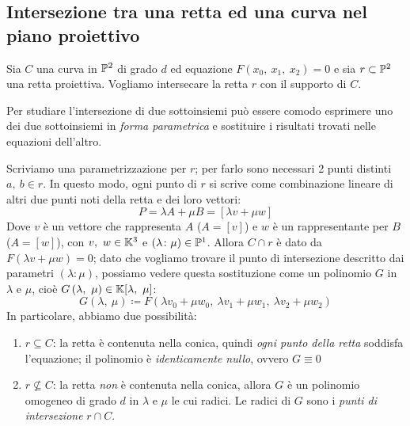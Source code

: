 \subsection{Intersezione tra una retta ed una curva nel piano proiettivo}
Sia $C$ una curva in $\proj[2]{\ }$ di grado $d$ ed equazione $F(x_0,\ x_1,\ x_2)=0$ e sia $r\subset\proj[2]{\ }$ una retta proiettiva. Vogliamo intersecare la retta $r$ con il supporto di $C$.
\begin{tips}
	Per studiare l'intersezione di due sottoinsiemi può essere comodo esprimere uno dei due sottoinsiemi in \textit{forma parametrica} e sostituire i risultati trovati nelle equazioni dell'altro.
\end{tips}
Scriviamo una parametrizzazione per $r$; per farlo sono necessari 2 punti distinti $a,\ b\in r$. In questo modo, ogni punto di $r$ si scrive come combinazione lineare di altri due punti noti della retta e dei loro vettori:
\begin{equation}
	P=\lambda A+\mu B=\left[\lambda v+\mu w\right]
\end{equation}
Dove $v$ è un vettore che rappresenta $A$ ($A=[v]$) e $w$ è un rappresentante per $B$ ($A=[w]$), con $v,\ w\in\mathbb{K}^3$ e $(\lambda\colon\mu)\in\proj[1]{\ }$. Allora $C\cap r$ è dato da $F(\lambda v+\mu w)=0$; dato che vogliamo trovare il punto di intersezione descritto dai parametri $(\lambda\colon\mu)$, possiamo vedere questa sostituzione come un polinomio $G$ in $\lambda$ e $\mu$, cioè $G\left(\lambda,\ \mu\right)\in\kamp[\lambda,\ \mu]$:
\begin{equation}
	G\left(\lambda,\ \mu\right)\coloneqq F(\lambda v_0+\mu w_0,\ \lambda v_1+\mu w_1,\ \lambda v_2+\mu w_2)
\end{equation}
In particolare, abbiamo due possibilità:
	\begin{enumerate}
	\item	$r\subseteq C$: la retta è contenuta nella conica, quindi \textit{ogni punto della retta} soddisfa l'equazione; il polinomio è \textit{identicamente nullo}, ovvero $G\equiv 0$
	\item	$r\nsubseteq C$: la retta \textit{non} è contenuta nella conica, allora $G$ è un polinomio omogeneo di grado $d$ in $\lambda$ e $\mu$ le cui radici. Le radici di $G$ sono i \textit{punti di intersezione} $r\cap C$.
\end{enumerate}
